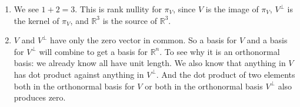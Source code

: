 \begin{SaveQuestion}
\begin{enumerate}
        \item We see $1 + 2  = 3$. This is rank nullity for $\pi_V$, since $V$ is the image of $\pi_V$, $V^{\perp}$ is the kernel of $\pi_V$, and $\mathbb R^3$ is the source of $\mathbb R^3$.
        \item $V$ and $V^{\perp}$ have only the zero vector in common. So a basis for $V$ and a basis for $V^{\perp}$ will combine to get a basis for $ \mathbb R^n$. 
					To see why it is an orthonormal basis: we already know all have unit length. We also know that anything in $V$ has dot product against anything in $V^{\perp}$. And the dot product of two elements both in the orthonormal basis for  $V$ or both in  the orthonormal basis $V^{\perp}$ also produces zero.
    \end{enumerate}
\end{SaveQuestion}


